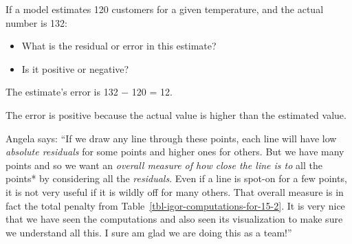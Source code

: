 \documentclass[
  12pt,
  letterpaper,
  DIV=11,
  numbers=noendperiod]{scrreprt}
\providecommand{\tightlist}{%
  \setlength{\itemsep}{0pt}\setlength{\parskip}{0pt}}
\begin{document}
\begin{tcolorbox}[enhanced jigsaw, colback=white, leftrule=.75mm, toprule=.15mm, bottomtitle=1mm, breakable, coltitle=black, toptitle=1mm, title=\textcolor{quarto-callout-note-color}{\faInfo}\hspace{0.5em}{Quick Check}, opacitybacktitle=0.6, colbacktitle=quarto-callout-note-color!10!white, arc=.35mm, left=2mm, colframe=quarto-callout-note-color-frame, titlerule=0mm, rightrule=.15mm, bottomrule=.15mm, opacityback=0]

If a model estimates 120 customers for a given temperature, and the
actual number is 132:

\begin{itemize}
\tightlist
\item
  What is the residual or error in this estimate?
\item
  Is it positive or negative?
\end{itemize}

\end{tcolorbox}

\begin{tcolorbox}[enhanced jigsaw, colback=white, leftrule=.75mm, toprule=.15mm, bottomtitle=1mm, breakable, coltitle=black, toptitle=1mm, title=\textcolor{quarto-callout-note-color}{\faInfo}\hspace{0.5em}{Answer}, opacitybacktitle=0.6, colbacktitle=quarto-callout-note-color!10!white, arc=.35mm, left=2mm, colframe=quarto-callout-note-color-frame, titlerule=0mm, rightrule=.15mm, bottomrule=.15mm, opacityback=0]

The estimate's error is 132 − 120 = 12.

The error is positive because the actual value is higher than the
estimated value.

\end{tcolorbox}

Angela says: ``If we draw any line through these points, each line will
have low \emph{absolute residuals} for some points and higher ones for
others. But we have many points and so we want an \emph{overall measure
of how close the line is to }all the points* by considering all the
\emph{residuals}. Even if a line is spot-on for a few points, it is not
very useful if it is wildly off for many others. That overall measure is
in fact the total penalty from
Table~\ref{tbl-igor-computations-for-15-2}. It is very nice that we have
seen the computations and also seen its visualization to make sure we
understand all this. I sure am glad we are doing this as a team!''
\end{document}
